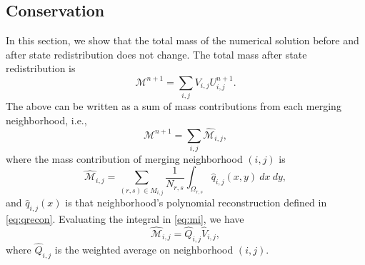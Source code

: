 \subsection{Conservation}\label{sec:cons}
In this section, we show that the total mass of the numerical solution before and after state redistribution does not change.  The total mass after state redistribution is 
\begin{equation}\label{eq:total_mass}
\mathcal{M}^{n+1} = \sum_{i,j} V_{i,j} U^{n+1}_{i,j}.
\end{equation}
The above can be written as a sum of mass contributions from each merging neighborhood, i.e.,
\begin{equation}\label{eq:total_mass2}
\mathcal{M}^{n+1} = \sum_{i,j} \widehat{\mathcal{M}}_{i,j},
\end{equation}
where the mass contribution of merging neighborhood $(i,j)$ is
\begin{equation}\label{eq:mi}
\widehat{\mathcal{M}}_{i,j} = \sum_{(r,s) \in M_{i,j}}\frac{1}{N_{r,s}} \int_{\Omega_{r,s}}\widehat q_{i,j}(x,y) ~dx~dy,
\end{equation}
and $\widehat q_{i,j}(x)$ is that neighborhood's polynomial reconstruction defined in \eqref{eq:qrecon}.
Evaluating the integral in \eqref{eq:mi}, we have
\begin{equation}\label{eq:mi1}
\widehat{\mathcal{M}}_{i,j} = \widehat Q_{i,j} \widehat V_{i,j}, 
\end{equation} 
where $\widehat Q_{i,j}$ is the weighted average on neighborhood $(i,j)$.
